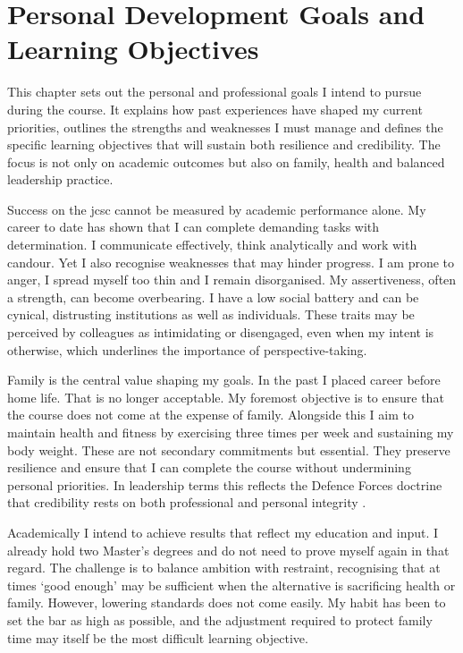 \chapter{Personal Development Goals and Learning Objectives}

This chapter sets out the personal and professional goals I intend to pursue during the course.  It explains how past experiences have shaped my current priorities, outlines the strengths and weaknesses  I must manage and defines the specific learning objectives that will sustain both resilience and credibility.  The focus is not only on academic outcomes but also on family, health and balanced leadership practice.

Success on the \gls{jcsc} cannot be measured by academic performance alone. My career to date has shown that I can complete demanding tasks with determination. I communicate effectively, think analytically and work with candour. Yet I also recognise weaknesses that may hinder progress. I am prone to anger, I spread myself too thin and I remain disorganised. My assertiveness, often a strength, can become overbearing. I have a low social battery and can be cynical, distrusting institutions as well as individuals. These traits may be perceived by colleagues as intimidating or disengaged, even when my intent is otherwise, which underlines the importance of perspective-taking.  

Family is the central value shaping my goals. In the past I placed career before home life. That is no longer acceptable. My foremost objective is to ensure that the course does not come at the expense of family. Alongside this I aim to maintain health and fitness by exercising three times per week and sustaining my body weight. These are not secondary commitments but essential. They preserve resilience and ensure that I can complete the course without undermining personal priorities. In leadership terms this reflects the Defence Forces doctrine that credibility rests on both professional and personal integrity \parencite{DF_LDR_2023}.  

Academically I intend to achieve results that reflect my education and input. I already hold two Master’s degrees and do not need to prove myself again in that regard. The challenge is to balance ambition with restraint, recognising that at times `good enough' may be sufficient when the alternative is sacrificing health or family. However, lowering standards does not come easily. My habit has been to set the bar as high as possible, and the adjustment required to protect family time may itself be the most difficult learning objective.  

